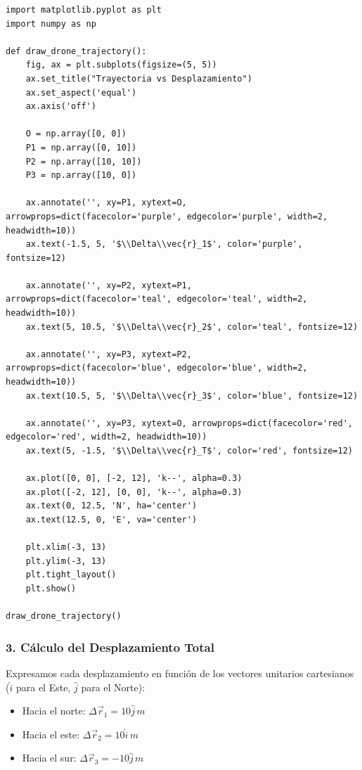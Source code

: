 \documentclass[12pt, a4paper]{article}
\begin{document}
\begin{lstlisting}
import matplotlib.pyplot as plt
import numpy as np

def draw_drone_trajectory():
    fig, ax = plt.subplots(figsize=(5, 5))
    ax.set_title("Trayectoria vs Desplazamiento")
    ax.set_aspect('equal')
    ax.axis('off')

    O = np.array([0, 0])
    P1 = np.array([0, 10])
    P2 = np.array([10, 10])
    P3 = np.array([10, 0])

    ax.annotate('', xy=P1, xytext=O, arrowprops=dict(facecolor='purple', edgecolor='purple', width=2, headwidth=10))
    ax.text(-1.5, 5, '$\\Delta\\vec{r}_1$', color='purple', fontsize=12)

    ax.annotate('', xy=P2, xytext=P1, arrowprops=dict(facecolor='teal', edgecolor='teal', width=2, headwidth=10))
    ax.text(5, 10.5, '$\\Delta\\vec{r}_2$', color='teal', fontsize=12)

    ax.annotate('', xy=P3, xytext=P2, arrowprops=dict(facecolor='blue', edgecolor='blue', width=2, headwidth=10))
    ax.text(10.5, 5, '$\\Delta\\vec{r}_3$', color='blue', fontsize=12)

    ax.annotate('', xy=P3, xytext=O, arrowprops=dict(facecolor='red', edgecolor='red', width=2, headwidth=10))
    ax.text(5, -1.5, '$\\Delta\\vec{r}_T$', color='red', fontsize=12)

    ax.plot([0, 0], [-2, 12], 'k--', alpha=0.3)
    ax.plot([-2, 12], [0, 0], 'k--', alpha=0.3)
    ax.text(0, 12.5, 'N', ha='center')
    ax.text(12.5, 0, 'E', va='center')

    plt.xlim(-3, 13)
    plt.ylim(-3, 13)
    plt.tight_layout()
    plt.show()

draw_drone_trajectory()
\end{lstlisting}

\subsubsection*{3. Cálculo del Desplazamiento Total}
Expresamos cada desplazamiento en función de los vectores unitarios cartesianos ($\hat{i}$ para el Este, $\hat{j}$ para el Norte):

\begin{itemize}
    \item Hacia el norte: $\Delta\vec{r}_1 = 10\hat{j} \, \si{m}$
    \item Hacia el este: $\Delta\vec{r}_2 = 10\hat{i} \, \si{m}$
    \item Hacia el sur: $\Delta\vec{r}_3 = -10\hat{j} \, \si{m}$
\end{itemize}
\end{document}
